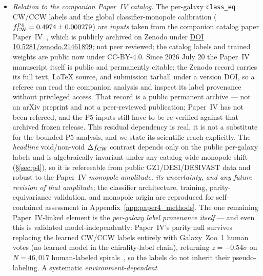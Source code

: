 \documentclass[twocolumn,linenumbers]{aastex702}
\newcommand{\paperIVarxiv}{publicly archived on Zenodo under
\href{https://doi.org/10.5281/zenodo.21461899}{DOI 10.5281/zenodo.21461899};
not peer reviewed}
\begin{document}
\begin{itemize}
rows, all residuals non-significant), including $88\%$ of the
filament \texttt{bright}-vs-\texttt{dark} sign-flip, from the committed
per-program classifier monopoles alone; it is a bounded surrogate and
does \emph{not} replace the definitive end-to-end injection--recovery
test, which requires a DR2-grade selection-function mock and is
explicitly deferred (\S\ref{sec:results_within_class_density},
\S\ref{sec:lsst}). Readers should treat the focal non-detection as
conditional on that unclosed systematic.
\item \emph{Relation to the companion Paper~IV catalog.}
The per-galaxy \texttt{class\_eq} CW/CCW labels and
the global classifier-monopole calibration ($f_{\rm CW}^{\rm P4} =
0.4974 \pm 0.000279$) are \emph{inputs} taken from the companion catalog
paper Paper~IV~\cite{golden_chirality_2026}, which is
\paperIVarxiv; the catalog labels and trained weights are public now under
CC-BY-4.0. Since 2026 July 20 the Paper~IV manuscript itself is public and
permanently citable: the Zenodo record carries its full text, \LaTeX{} source,
and submission tarball under a version DOI, so a referee can read the companion
analysis and inspect its label provenance without privileged access. That
record is a public permanent archive --- not an arXiv preprint and not a
peer-reviewed publication; Paper~IV has not been refereed, and the P5 inputs
still have to be re-verified against that archived frozen release. This
residual dependency is real, it is not a substitute for the bounded P5
analysis, and we state its scientific reach explicitly. The \emph{headline}
void/non-void $\Delta f_{\rm CW}$ contrast depends only on the public
per-galaxy labels and is algebraically invariant under any catalog-wide
monopole shift (\S\ref{sec:p4}), so it is refereeable from public
GZ1/DESI/DESIVAST data and robust to the Paper~IV \emph{monopole amplitude,
its uncertainty, and any future revision of that amplitude}; the classifier
architecture, training, parity-equivariance validation, and monopole origin
are reproduced for self-contained assessment in
Appendix~\ref{app:paper4_methods}. The one remaining Paper~IV-linked
element is the \emph{per-galaxy label provenance itself} --- and even this
is validated model-independently: Paper~IV's parity null survives replacing
the learned CW/CCW labels entirely with Galaxy~Zoo~1 human votes (no learned
model in the chirality-label chain), returning $z=-0.54\sigma$ on
$N=46{,}017$ human-labeled spirals~\cite{golden_chirality_2026}, so the
labels do not inherit their pseudo-labeling. A systematic \emph{environment-dependent}

\end{itemize}
\end{document}
